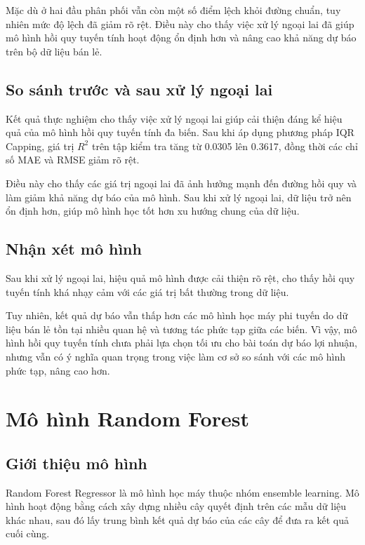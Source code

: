 Mặc dù ở hai đầu phân phối vẫn còn một số điểm lệch khỏi đường chuẩn, tuy nhiên mức độ lệch đã giảm rõ rệt. Điều này cho thấy việc xử lý ngoại lai đã giúp mô hình hồi quy tuyến tính hoạt động ổn định hơn và nâng cao khả năng dự báo trên bộ dữ liệu bán lẻ.

\subsection*{\thesubsection\quad So sánh trước và sau xử lý ngoại lai}

Kết quả thực nghiệm cho thấy việc xử lý ngoại lai giúp cải thiện đáng kể hiệu quả của mô hình hồi quy tuyến tính đa biến. Sau khi áp dụng phương pháp IQR Capping, giá trị \(R^2\) trên tập kiểm tra tăng từ 0.0305 lên 0.3617, đồng thời các chỉ số MAE và RMSE giảm rõ rệt.

Điều này cho thấy các giá trị ngoại lai đã ảnh hưởng mạnh đến đường hồi quy và làm giảm khả năng dự báo của mô hình. Sau khi xử lý ngoại lai, dữ liệu trở nên ổn định hơn, giúp mô hình học tốt hơn xu hướng chung của dữ liệu.

\subsection*{\thesubsection\quad Nhận xét mô hình}

Sau khi xử lý ngoại lai, hiệu quả mô hình được cải thiện rõ rệt, cho thấy hồi quy tuyến tính khá nhạy cảm với các giá trị bất thường trong dữ liệu.

Tuy nhiên, kết quả dự báo vẫn thấp hơn các mô hình học máy phi tuyến do dữ liệu bán lẻ tồn tại nhiều quan hệ và tương tác phức tạp giữa các biến. Vì vậy, mô hình hồi quy tuyến tính chưa phải lựa chọn tối ưu cho bài toán dự báo lợi nhuận, nhưng vẫn có ý nghĩa quan trọng trong việc làm cơ sở so sánh với các mô hình phức tạp, nâng cao hơn.

\section{Mô hình Random Forest}

\subsection*{\thesubsection\quad Giới thiệu mô hình}

Random Forest Regressor là mô hình học máy thuộc nhóm ensemble learning. Mô hình hoạt động bằng cách xây dựng nhiều cây quyết định trên các mẫu dữ liệu khác nhau, sau đó lấy trung bình kết quả dự báo của các cây để đưa ra kết quả cuối cùng.

